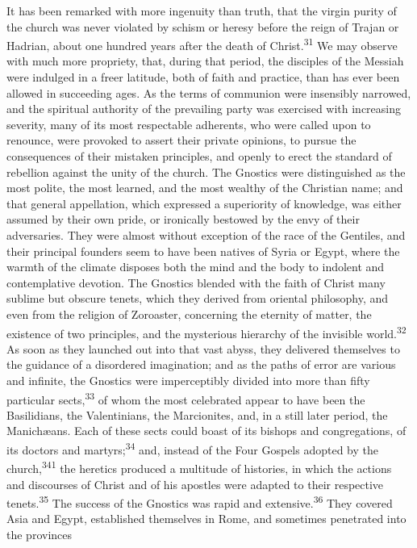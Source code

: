 It has been remarked with more ingenuity than truth, that the
virgin purity of the church was never violated by schism or
heresy before the reign of Trajan or Hadrian, about one hundred
years after the death of Christ.\textsuperscript{31} We may observe with much more
propriety, that, during that period, the disciples of the Messiah
were indulged in a freer latitude, both of faith and practice,
than has ever been allowed in succeeding ages. As the terms of
communion were insensibly narrowed, and the spiritual authority
of the prevailing party was exercised with increasing severity,
many of its most respectable adherents, who were called upon to
renounce, were provoked to assert their private opinions, to
pursue the consequences of their mistaken principles, and openly
to erect the standard of rebellion against the unity of the
church. The Gnostics were distinguished as the most polite, the
most learned, and the most wealthy of the Christian name; and
that general appellation, which expressed a superiority of
knowledge, was either assumed by their own pride, or ironically
bestowed by the envy of their adversaries. They were almost
without exception of the race of the Gentiles, and their
principal founders seem to have been natives of Syria or Egypt,
where the warmth of the climate disposes both the mind and the
body to indolent and contemplative devotion. The Gnostics blended
with the faith of Christ many sublime but obscure tenets, which
they derived from oriental philosophy, and even from the religion
of Zoroaster, concerning the eternity of matter, the existence of
two principles, and the mysterious hierarchy of the invisible
world.\textsuperscript{32} As soon as they launched out into that vast abyss, they
delivered themselves to the guidance of a disordered imagination;
and as the paths of error are various and infinite, the Gnostics
were imperceptibly divided into more than fifty particular sects,\textsuperscript{33}
of whom the most celebrated appear to have been the
Basilidians, the Valentinians, the Marcionites, and, in a still
later period, the Manichæans. Each of these sects could boast of
its bishops and congregations, of its doctors and martyrs;\textsuperscript{34}
and, instead of the Four Gospels adopted by the church,\textsuperscript{341} the
heretics produced a multitude of histories, in which the actions
and discourses of Christ and of his apostles were adapted to
their respective tenets.\textsuperscript{35} The success of the Gnostics was rapid
and extensive.\textsuperscript{36} They covered Asia and Egypt, established
themselves in Rome, and sometimes penetrated into the provinces
